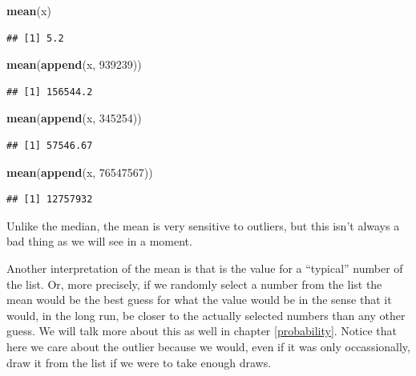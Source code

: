 \documentclass[]{book}
\newenvironment{Shaded}{\begin{snugshade}}{\end{snugshade}}
\newcommand{\DecValTok}[1]{\textcolor[rgb]{0.00,0.00,0.81}{#1}}
\newcommand{\KeywordTok}[1]{\textcolor[rgb]{0.13,0.29,0.53}{\textbf{#1}}}
\newcommand{\NormalTok}[1]{#1}
\begin{document}
\begin{Shaded}
\begin{Highlighting}[]
\KeywordTok{mean}\NormalTok{(x)}
\end{Highlighting}
\end{Shaded}

\begin{verbatim}
## [1] 5.2
\end{verbatim}

\begin{Shaded}
\begin{Highlighting}[]
\KeywordTok{mean}\NormalTok{(}\KeywordTok{append}\NormalTok{(x, }\DecValTok{939239}\NormalTok{))}
\end{Highlighting}
\end{Shaded}

\begin{verbatim}
## [1] 156544.2
\end{verbatim}

\begin{Shaded}
\begin{Highlighting}[]
\KeywordTok{mean}\NormalTok{(}\KeywordTok{append}\NormalTok{(x, }\DecValTok{345254}\NormalTok{))}
\end{Highlighting}
\end{Shaded}

\begin{verbatim}
## [1] 57546.67
\end{verbatim}

\begin{Shaded}
\begin{Highlighting}[]
\KeywordTok{mean}\NormalTok{(}\KeywordTok{append}\NormalTok{(x, }\DecValTok{76547567}\NormalTok{))}
\end{Highlighting}
\end{Shaded}

\begin{verbatim}
## [1] 12757932
\end{verbatim}

Unlike the median, the mean is very sensitive to outliers, but this isn't always a bad thing as we will see in a moment.

Another interpretation of the mean is that is the value for a ``typical'' number of the list. Or, more precisely, if we randomly select a number from the list the mean would be the best guess for what the value would be in the sense that it would, in the long run, be closer to the actually selected numbers than any other guess. We will talk more about this as well in chapter \ref{probability}. Notice that here we care about the outlier because we would, even if it was only occassionally, draw it from the list if we were to take enough draws.
\end{document}
